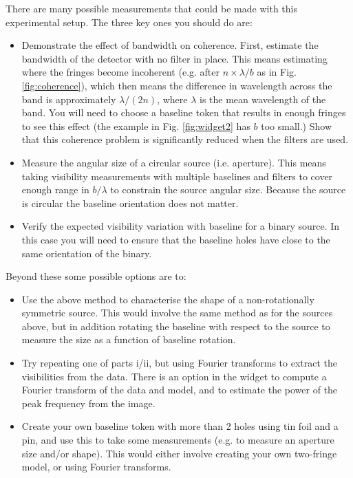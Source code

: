 \documentclass[11pt]{article}
\begin{document}
There are many possible measurements that could be made with this experimental setup. The three key ones you should do are:
\begin{itemize}
    \item Demonstrate the effect of bandwidth on coherence. First, estimate the bandwidth of the detector with no filter in place. This means estimating where the fringes become incoherent (e.g. after $n \times \lambda/b$ as in Fig. \ref{fig:coherence}), which then means the difference in wavelength across the band is approximately $\lambda/(2n)$, where $\lambda$ is the mean wavelength of the band. You will need to choose a baseline token that results in enough fringes to see this effect (the example in Fig. \ref{fig:widget2} has $b$ too small.) Show that this coherence problem is significantly reduced when the filters are used.
    \item Measure the angular size of a circular source (i.e. aperture). This means taking visibility measurements with multiple baselines and filters to cover enough range in $b/\lambda$ to constrain the source angular size. Because the source is circular the baseline orientation does not matter.
    \item Verify the expected visibility variation with baseline for a binary source. In this case you will need to ensure that the baseline holes have close to the same orientation of the binary. 
\end{itemize}

Beyond these some possible options are to:
\begin{itemize}
    \item Use the above method to characterise the shape of a non-rotationally symmetric source. This would involve the same method as for the sources above, but in addition rotating the baseline with respect to the source to measure the size as a function of baseline rotation.
    \item Try repeating one of parts i/ii, but using Fourier transforms to extract the visibilities from the data. There is an option in the widget to compute a Fourier transform of the data and model, and to estimate the power of the peak frequency from the image.
    \item Create your own baseline token with more than 2 holes using tin foil and a pin, and use this to take some measurements (e.g. to measure an aperture size and/or shape). This would either involve creating your own two-fringe model, or using Fourier transforms.
\end{itemize}
\end{document}
